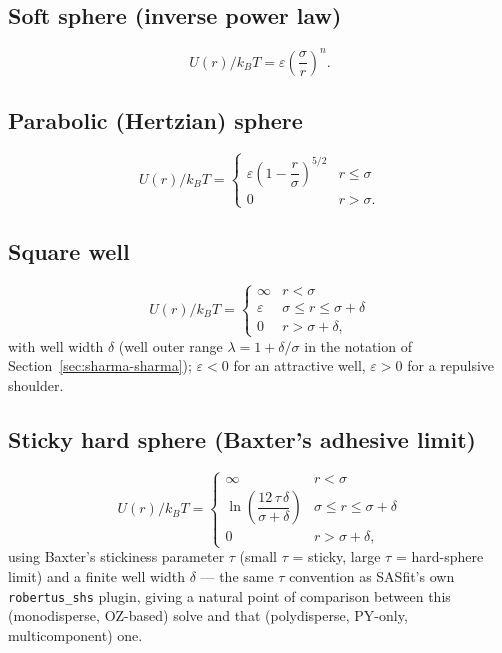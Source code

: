 \documentclass[11pt,a4paper]{article}
\newcommand{\code}[1]{\texttt{#1}}
\begin{document}
\subsection{Soft sphere (inverse power law)}
\begin{equation}
  U(r)/k_BT = \varepsilon\left(\frac{\sigma}{r}\right)^{n}.
\end{equation}

\subsection{Parabolic (Hertzian) sphere}
\begin{equation}
  U(r)/k_BT = \begin{cases}\varepsilon\left(1-\dfrac{r}{\sigma}\right)^{5/2} & r\le\sigma\\ 0 & r>\sigma.\end{cases}
\end{equation}

\subsection{Square well}
\label{sec:squarewell-potential}
\begin{equation}
  U(r)/k_BT = \begin{cases} \infty & r<\sigma\\ \varepsilon & \sigma\le r\le\sigma+\delta \\ 0 & r>\sigma+\delta,\end{cases}
\end{equation}
with well width $\delta$ (well outer range $\lambda=1+\delta/\sigma$ in the
notation of Section~\ref{sec:sharma-sharma}); $\varepsilon<0$ for an attractive
well, $\varepsilon>0$ for a repulsive shoulder.

\subsection{Sticky hard sphere (Baxter's adhesive limit)}
\label{sec:stickyhs-potential}
\begin{equation}
  U(r)/k_BT = \begin{cases} \infty & r<\sigma\\ \ln\!\left(\dfrac{12\,\tau\,\delta}{\sigma+\delta}\right) & \sigma\le r\le\sigma+\delta\\ 0 & r>\sigma+\delta,\end{cases}
\end{equation}
using Baxter's stickiness parameter $\tau$ (small $\tau$ = sticky, large $\tau$
= hard-sphere limit) and a finite well width $\delta$ --- the same $\tau$
convention as SASfit's own \code{robertus\_shs} plugin, giving a natural point
of comparison between this (monodisperse, OZ-based) solve and that
(polydisperse, PY-only, multicomponent) one.
\end{document}
